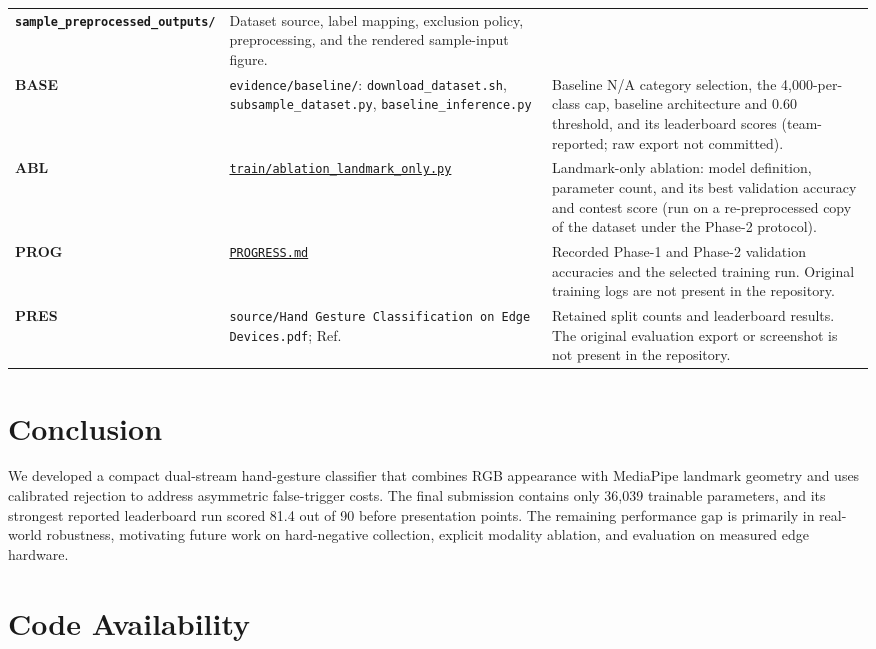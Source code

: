 \documentclass[10pt,twocolumn,a4paper]{article}
\newcommand{\ProjectRepository}{https://github.com/xxjustintwxx/Multimedia_Final_Project}
\newcommand{\codepath}[1]{%
  \href{\ProjectRepository/blob/main/#1}{\nolinkurl{#1}}%
}
\begin{document}
\begin{table}[t]
\begin{tabular}{>{\bfseries}p{}p{}p{}}
        \texttt{sample\_preprocessed\_outputs/}
      & Dataset source, label mapping, exclusion policy, preprocessing, and the
        rendered sample-input figure. \\
    \label{ev:BASE}BASE
      & \texttt{evidence/baseline/}: \texttt{download\_dataset.sh},
        \texttt{subsample\_dataset.py}, \texttt{baseline\_inference.py}
      & Baseline N/A category selection, the 4{,}000-per-class cap, baseline
        architecture and 0.60 threshold, and its leaderboard scores
        (team-reported; raw export not committed). \\
    \label{ev:ABL}ABL
      & \codepath{train/ablation_landmark_only.py}
      & Landmark-only ablation: model definition, parameter count, and its best
        validation accuracy and contest score (run on a re-preprocessed copy of
        the dataset under the Phase-2 protocol). \\
    \label{ev:PROG}PROG
      & \codepath{PROGRESS.md}
      & Recorded Phase-1 and Phase-2 validation accuracies and the selected
        training run. Original training logs are not present in the repository. \\
    \label{ev:PRES}PRES
      & \texttt{source/Hand Gesture Classification on Edge Devices.pdf};
        Ref.~\cite{team14presentation}
      & Retained split counts and leaderboard results. The original evaluation
        export or screenshot is not present in the repository. \\
    \bottomrule
  \end{tabular}
\end{table}

\section{Conclusion}
\label{sec:conclusion}

We developed a compact dual-stream hand-gesture classifier that combines RGB
appearance with MediaPipe landmark geometry and uses calibrated rejection to
address asymmetric false-trigger costs. The final submission contains only
36,039 trainable parameters, and its strongest reported leaderboard run scored
81.4 out of 90 before presentation points. The remaining performance gap is
primarily in real-world robustness, motivating future work on hard-negative
collection, explicit modality ablation, and evaluation on measured edge
hardware.

\section*{Code Availability}
\end{document}
